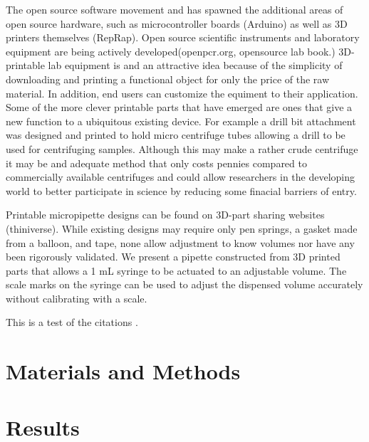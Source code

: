 The open source software movement and has spawned the additional areas of open source hardware, such as microcontroller boards (Arduino) as well as 3D printers themselves (RepRap).
Open source scientific instruments and laboratory equipment are being actively developed(openpcr.org, opensource lab book.)
3D-printable lab equipment is and an attractive idea because of the simplicity of downloading and printing a functional object for only the price of the raw material. 
In addition, end users can customize the equiment to their application. 
Some of the more clever printable parts that have emerged are ones that give a new function to a ubiquitous existing device.
For example a drill bit attachment was designed and printed to hold micro centrifuge tubes allowing a drill to be used for centrifuging samples. 
Although this may make a rather crude centrifuge it may be and adequate method that only costs pennies compared to commercially available centrifuges and could allow researchers in the developing world to better participate in science by reducing some finacial barriers of entry.

Printable micropipette designs can be found on 3D-part sharing websites (thiniverse).
While existing designs may require only pen springs, a gasket made from a balloon, and tape, none allow adjustment to know volumes nor have any been rigorously validated.
We present a pipette constructed from 3D printed parts that allows a 1 mL syringe to be actuated to an adjustable volume.
The scale marks on the syringe can be used to adjust the dispensed volume accurately without calibrating with a scale.



This is a test of the citations \cite{oppegard2010}.


\section*{Materials and Methods}

\section*{Results}

